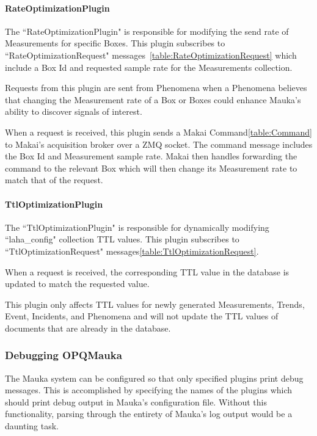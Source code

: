 \paragraph{RateOptimizationPlugin}

The ``RateOptimizationPlugin" is responsible for modifying the send rate of Measurements for specific Boxes. This plugin subscribes to ``RateOptimizationRequest" messages~\ref{table:RateOptimizationRequest} which include a Box Id and requested sample rate for the Measurements collection.

Requests from this plugin are sent from Phenomena when a Phenomena believes that changing the Measurement rate of a Box or Boxes could enhance Mauka's ability to discover signals of interest.

When a request is received, this plugin sends a Makai Command\ref{table:Command} to Makai's acquisition broker over a ZMQ socket. The command message includes the Box Id and Measurement sample rate. Makai then handles forwarding the command to the relevant Box which will then change its Measurement rate to match that of the request.

\paragraph{TtlOptimizationPlugin}\label{subsubsec:ttl-optimization-pugin}

The ``TtlOptimizationPlugin" is responsible for dynamically modifying ``laha\_config" collection TTL values. This plugin subscribes to ``TtlOptimizationRequest" messages\ref{table:TtlOptimizationRequest}.

When a request is received, the corresponding TTL value in the database is updated to match the requested value.

This plugin only affects TTL values for newly generated Measurements, Trends, Event, Incidents, and Phenomena and will not update the TTL values of documents that are already in the database.

\subsubsection{Debugging OPQMauka}
The Mauka system can be configured so that only specified plugins print debug messages. This is accomplished by specifying the names of the plugins which should print debug output in Mauka's configuration file. Without this functionality, parsing through the entirety of Mauka's log output would be a daunting task.

